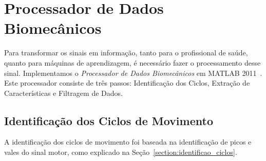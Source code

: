 % 
% 		
% 		
% 
% 		

\section{Processador de Dados Biomecânicos}\label{sec:processador_bio}
Para transformar os sinais em informação, tanto para o profissional de saúde, quanto para máquinas de aprendizagem, é necessário fazer o processamento desse sinal. Implementamos o \textit{Processador de Dados Biomecânicos} em MATLAB 2011~\cite{matlab2011}. Este processador consiste de três passos: Identificação dos Ciclos, Extração de Características e Filtragem de Dados.

\subsection{Identificação dos Ciclos de Movimento} 
A identificação dos ciclos de movimento foi baseada na identificação de picos e vales do sinal motor, como explicado na Seção~\ref{section:identificao_ciclos}. 

